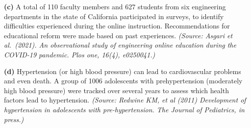 \documentclass{ximera}
\begin{document}
\begin{problem}
\begin{question}
\textbf{(c)} A total of 110 faculty members and 627 students from six engineering departments in the state of California participated in surveys, to identify difficulties experienced during the online instruction. Recommendations for educational reform were made based on past experiences. \emph{(Source: Asgari et al.\ (2021). An observational study of engineering online education during the COVID-19 pandemic. Plos one, 16(4), e0250041.)}
\begin{multipleChoice}
\end{multipleChoice}
\end{question}

\begin{question}
\textbf{(d)} Hypertension (or high blood pressure) can lead to cardiovascular problems and even death. A group of 1006 adolescents with prehypertension (moderately high blood pressure) were tracked over several years to assess which health factors lead to hypertension. \emph{(Source: Redwine KM, et al (2011) Development of hypertension in adolescents with pre-hypertension. The Journal of Pediatrics, in press.)}
\begin{multipleChoice}
\end{multipleChoice}
\end{question}
\end{problem}
\end{document}
